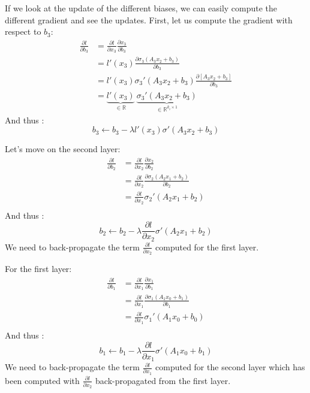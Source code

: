 \begin{frame}
	If we look at the update of the different biases, we can easily compute the different gradient and see the updates.
	First, let us compute the gradient with respect to $b_3$:
	\begin{align*}
		\frac{\partial l}{\partial b_3} & = \frac{\partial l}{\partial x_3}\frac{\partial x_3}{\partial b_3}                                                  \\
		                                & =l'(x_3)\frac{\partial \sigma_3\left(A_3x_2+b_3\right)}{\partial b_3}                                               \\
		                                & = l'(x_3)\sigma_3'\left(A_3x_2+b_3\right)\frac{\partial \left[A_3x_2+b_3\right]}{\partial b_3}                      \\
		                                & = \underbrace{l'(x_3)}_{\in\mathbb{R}}\:\underbrace{\sigma_3'\left(A_3x_2+b_3\right)}_{\in\mathbb{R}^{k_i\times 1}}
	\end{align*}
	And thus :
	$$
		b_3 \leftarrow b_3 - \lambda l'(x_3)\sigma'\left(A_3x_2+b_3\right)
	$$
\end{frame}
\begin{frame}
	Let's move on the second layer:
	\begin{align*}
		\frac{\partial l}{\partial b_2} & = \frac{\partial l}{\partial x_2}\frac{\partial x_2}{\partial b_2}                            \\
		                                & =\frac{\partial l}{\partial x_2}\frac{\partial \sigma_2\left(A_2x_1+b_2\right)}{\partial b_2} \\
		                                & =\frac{\partial l}{\partial x_2} \sigma_2'\left(A_2x_1+b_2\right)                             \\
	\end{align*}
	And thus :
	$$
		b_2 \leftarrow b_2 - \lambda	\frac{\partial l}{\partial x_2} \sigma'\left(A_2x_1+b_2\right)
	$$
	We need to back-propagate the term $\frac{\partial l}{\partial x_2}$ computed for the first layer.
\end{frame}

\begin{frame}
	For the first layer:
	\begin{align*}
		\frac{\partial l}{\partial b_1} & = \frac{\partial l}{\partial x_1}\frac{\partial x_1}{\partial b_1}                            \\
		                                & =\frac{\partial l}{\partial x_1}\frac{\partial \sigma_1\left(A_1x_0+b_1\right)}{\partial b_1} \\
		                                & =\frac{\partial l}{\partial x_1} \sigma_1'\left(A_1x_0+b_0\right)                             \\
	\end{align*}
	And thus :
	$$
		b_1 \leftarrow b_1 - \lambda	\frac{\partial l}{\partial x_1} \sigma'\left(A_1x_0+b_1\right)
	$$
	We need to back-propagate the term $\frac{\partial l}{\partial x_1}$ computed for the second layer which has been computed with $\frac{\partial l}{\partial x_2}$ back-propagated from the first layer.
\end{frame}

